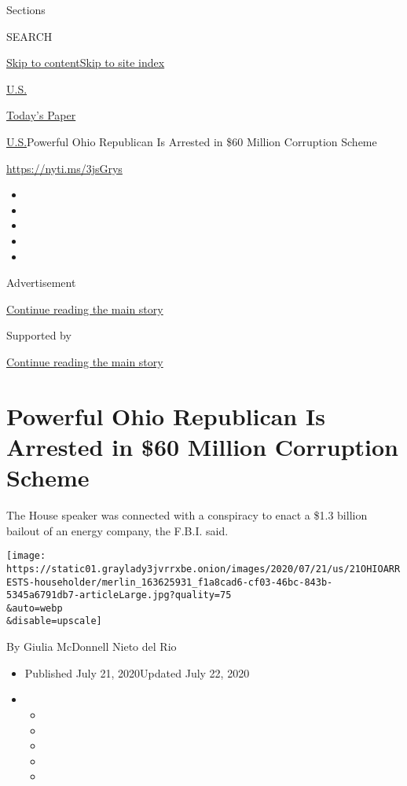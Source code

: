 Sections

SEARCH

\protect\hyperlink{site-content}{Skip to
content}\protect\hyperlink{site-index}{Skip to site index}

\href{https://www.nytimes3xbfgragh.onion/section/us}{U.S.}

\href{https://myaccount.nytimes3xbfgragh.onion/auth/login?response_type=cookie\&client_id=vi}{}

\href{https://www.nytimes3xbfgragh.onion/section/todayspaper}{Today's
Paper}

\href{/section/us}{U.S.}\textbar{}Powerful Ohio Republican Is Arrested
in \$60 Million Corruption Scheme

\url{https://nyti.ms/3jsGrys}

\begin{itemize}
\item
\item
\item
\item
\item
\end{itemize}

Advertisement

\protect\hyperlink{after-top}{Continue reading the main story}

Supported by

\protect\hyperlink{after-sponsor}{Continue reading the main story}

\hypertarget{powerful-ohio-republican-is-arrested-in-60-million-corruption-scheme}{%
\section{Powerful Ohio Republican Is Arrested in \$60 Million Corruption
Scheme}\label{powerful-ohio-republican-is-arrested-in-60-million-corruption-scheme}}

The House speaker was connected with a conspiracy to enact a \$1.3
billion bailout of an energy company, the F.B.I. said.

\texttt{[image: https://static01.graylady3jvrrxbe.onion/images/2020/07/21/us/21OHIOARRESTS-householder/merlin\_163625931\_f1a8cad6-cf03-46bc-843b-5345a6791db7-articleLarge.jpg?quality=75\\\&auto=webp\\\&disable=upscale]}

By Giulia McDonnell Nieto del Rio

\begin{itemize}
\item
  Published July 21, 2020Updated July 22, 2020
\item
  \begin{itemize}
  \item
  \item
  \item
  \item
  \item
  \end{itemize}
\end{itemize}

